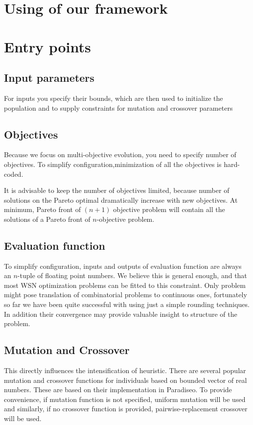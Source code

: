 \documentclass[12pt,oneside]{fithesis2}
\begin{document}
\section{Using of our framework}

\section{Entry points}

\subsection{Input parameters}
For inputs you specify their bounds, which are then used to initialize the population and to supply constraints for mutation and crossover parameters

\subsection{Objectives}
Because we focus on multi-objective evolution, you need to specify number of objectives. To simplify configuration,minimization of all the objectives is hard-coded.

It is advisable to keep the number of objectives limited, because number of solutions on the Pareto optimal dramatically increase with new objectives. At minimum, Pareto front of $(n+1)$ objective problem will contain all the solutions of a Pareto front of $n$-objective problem. \cite{talbi2009metaheuristics}

\subsection{Evaluation function}

To simplify configuration, inputs and outputs of evaluation function are always an $n$-tuple of floating point numbers. We believe this is general enough, and that most WSN optimization problems can be fitted to this constraint. Only problem might pose translation of combinatorial problems to continuous ones, fortunately so far we have been quite successful with using just a simple rounding techniques. In addition their convergence may provide valuable insight to structure of the problem.

\subsection{Mutation and Crossover}
This directly influences the intensification of heuristic. There are several popular mutation and crossover functions for individuals based on bounded vector of real numbers. These are based on their implementation in Paradiseo. To provide convenience, if mutation function is not specified, uniform mutation will be used and similarly, if no crossover function is provided, pairwise-replacement crossover will be used. 
\end{document}
